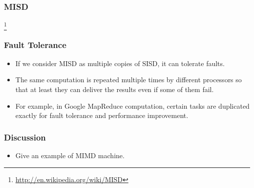 \documentclass{beamer}
\begin{document}
\begin{CJK}{UTF8}{bsmi}
\begin{frame}
\frametitle{MISD}
\centerline{}
\footnote{\url{http://en.wikipedia.org/wiki/MISD}}
\end{frame}

\begin{frame}
\frametitle{Fault Tolerance}
\begin{itemize}
\item If we consider MISD as multiple copies of SISD, it can tolerate faults.
\item The same computation is repeated multiple times by different processors so that at least they can deliver the results even if some of them fail.
\item For example, in Google MapReduce computation, certain tasks are duplicated exactly for fault tolerance and performance improvement.
\end{itemize}
\end{frame}

\begin{frame}
\frametitle{Discussion}
\begin{itemize}
\item Give an example of MIMD machine.
\end{itemize}
\end{frame}

\end{CJK}
\end{document}
